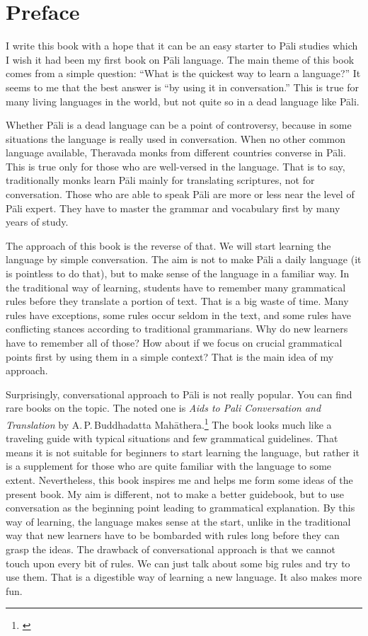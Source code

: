 \cleardoublepage
{}
{}
\chapter*{Preface}

I write this book with a hope that it can be an easy starter to P\=ali studies which I wish it had been my first book on P\=ali language. The main theme of this book comes from a simple question: ``What is the quickest way to learn a language?'' It seems to me that the best answer is ``by using it in conversation.'' This is true for many living languages in the world, but not quite so in a dead language like P\=ali.

Whether P\=ali is a dead language can be a point of controversy, because in some situations the language is really used in conversation. When no other common language available, Theravada monks from different countries converse in P\=ali. This is true only for those who are well-versed in the language. That is to say, traditionally monks learn P\=ali mainly for translating scriptures, not for conversation. Those who are able to speak P\=ali are more or less near the level of P\=ali expert. They have to master the grammar and vocabulary first by many years of study.

The approach of this book is the reverse of that. We will start learning the language by simple conversation. The aim is not to make P\=ali a daily language (it is pointless to do that), but to make sense of the language in a familiar way. In the traditional way of learning, students have to remember many grammatical rules before they translate a portion of text. That is a big waste of time. Many rules have exceptions, some rules occur seldom in the text, and some rules have conflicting stances according to traditional grammarians. Why do new learners have to remember all of those? How about if we focus on crucial grammatical points first by using them in a simple context? That is the main idea of my approach.

Surprisingly, conversational approach to P\=ali is not really popular. You can find rare books on the topic. The noted one is \emph{Aids to Pali Conversation and Translation} by A.\,P.\,Buddhadatta Mah\=athera.\footnote{\citealp{buddhadatta:aids}} The book looks much like a traveling guide with typical situations and few grammatical guidelines. That means it is not suitable for beginners to start learning the language, but rather it is a supplement for those who are quite familiar with the language to some extent. Nevertheless, this book inspires me and helps me form some ideas of the present book. My aim is different, not to make a better guidebook, but to use conversation as the beginning point leading to grammatical explanation. By this way of learning, the language makes sense at the start, unlike in the traditional way that new learners have to be bombarded with rules long before they can grasp the ideas. The drawback of conversational approach is that we cannot touch upon every bit of rules. We can just talk about some big rules and try to use them. That is a digestible way of learning a new language. It also makes more fun.

